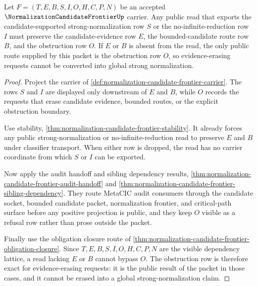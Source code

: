 \begin{theorem}
\label{thm:normalization-candidate-frontier-obstruction-exactness}
Let $F=(T,E,B,S,I,O,H,C,P,N)$ be an accepted $\NormalizationCandidateFrontierUp$ carrier. Any public read that exports the candidate-supported strong-normalization row $S$ or the no-infinite-reduction row $I$ must preserve the candidate-evidence row $E$, the bounded-candidate route row $B$, and the obstruction row $O$. If $E$ or $B$ is absent from the read, the only public route supplied by this packet is the obstruction row $O$, so evidence-erasing requests cannot be converted into global strong normalization.
\end{theorem}
\begin{proof}
Project the carrier of \autoref{def:normalization-candidate-frontier-carrier}. The rows $S$ and $I$ are displayed only downstream of $E$ and $B$, while $O$ records the requests that erase candidate evidence, bounded routes, or the explicit obstruction boundary.

Use stability, \autoref{thm:normalization-candidate-frontier-stability}. It already forces any public strong-normalization or no-infinite-reduction read to preserve $E$ and $B$ under classifier transport. When either row is dropped, the read has no carrier coordinate from which $S$ or $I$ can be exported.

Now apply the audit handoff and sibling dependency results, \autoref{thm:normalization-candidate-frontier-audit-handoff} and \autoref{thm:normalization-candidate-frontier-sibling-dependency}. They route MetaCIC audit consumers through the candidate socket, bounded candidate packet, normalization frontier, and critical-path surface before any positive projection is public, and they keep $O$ visible as a refusal row rather than prose outside the packet.

Finally use the obligation closure route of \autoref{thm:normalization-candidate-frontier-obligation-closure}. Since $T,E,B,S,I,O,H,C,P,N$ are the visible dependency lattice, a read lacking $E$ or $B$ cannot bypass $O$. The obstruction row is therefore exact for evidence-erasing requests: it is the public result of the packet in those cases, and it cannot be erased into a global strong-normalization claim.
\end{proof}

